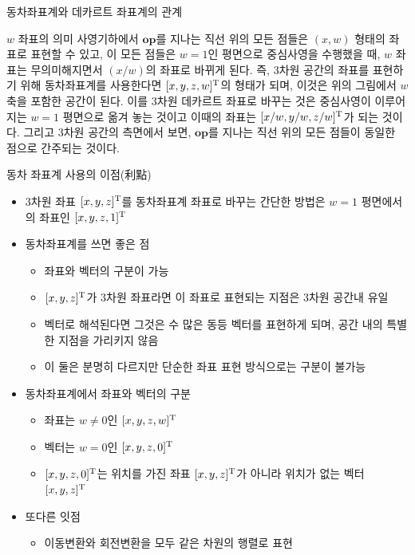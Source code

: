\begin{frame}{동차좌표계와 데카르트 좌표계의 관계}

\begin{block}{$w$ 좌표의 의미}
사영기하에서 $\mathbf {op}$를 지나는 직선 위의 모든 점들은 $(x,w)$ 형태의 좌표로 표현할 수 있고,
이 모든 점들은 $w=1$인 평면으로 중심사영을 수행했을 때, $w$ 좌표는 무의미해지면서 $(x/w)$의 좌표로 바뀌게 된다.
즉, 3차원 공간의 좌표를 표현하기 위해 동차좌표계를 사용한다면 $[x,y,z,w]^{\rm T}$의 형태가 되며,
이것은 위의 그림에서 $w$ 축을 포함한 공간이 된다. 이를 3차원 데카르트 좌표로 바꾸는 것은 
중심사영이 이루어지는 $w=1$ 평면으로 옮겨 놓는 것이고 이때의 좌표는 $[x/w,y/w,z/w]^{\rm T}$가 되는 것이다.
그리고 3차원 공간의 측면에서 보면, $\mathbf {op}$를 지나는 직선 위의 모든 점들이 동일한 점으로 간주되는 것이다.
\end{block}

\end{frame}


\begin{frame}{동차 좌표계 사용의 이점(利點)}

\begin{itemize}
\item 3차원 좌표 $[x,y,z]^{\rm T}$를 동차좌표계 좌표로 바꾸는 간단한 방법은 $w=1$ 평면에서의 좌표인 $[x,y,z,1]^{\rm T}$
\item 동차좌표계를 쓰면 좋은 점
	\begin{itemize}
	\item 좌표와 벡터의 구분이 가능
	\item $[x,y,z]^{\rm T}$가 3차원 좌표라면 이 좌표로 표현되는 지점은 3차원 공간내 유일
	\item 벡터로 해석된다면 그것은 수 많은 동등 벡터를 표현하게 되며, 공간 내의 특별한 지점을 가리키지 않음
	\item 이 둘은 분명히 다르지만 단순한 좌표 표현 방식으로는 구분이 불가능
	\end{itemize}
\item 동차좌표계에서 좌표와 벡터의 구분
	\begin{itemize}
	\item 좌표는 $w \neq 0$인 $[x,y,z,w]^{\rm T}$
	\item 벡터는 $w = 0$인 $[x,y,z,0]^{\rm T}$
	\item $[x,y,z,0]^{\rm T}$는 위치를 가진 좌표 $[x,y,z]^{\rm T}$가 아니라 위치가 없는 벡터 $[x,y,z]^{\rm T}$
	\end{itemize}
\item 또다른 잇점
	\begin{itemize}
	\item 이동변환와 회전변환을 모두 같은 차원의 행렬로 표현
	\end{itemize}
\end{itemize}


\end{frame}


